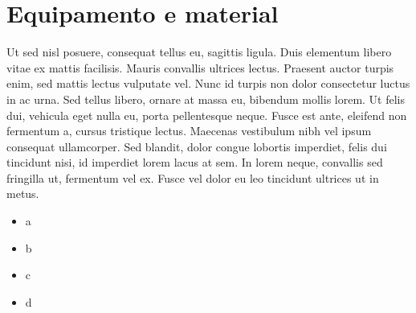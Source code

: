 \section{Equipamento e material}
Ut sed nisl posuere, consequat tellus eu, sagittis ligula. Duis elementum libero vitae ex mattis facilisis. Mauris convallis ultrices lectus. Praesent auctor turpis enim, sed mattis lectus vulputate vel. Nunc id turpis non dolor consectetur luctus in ac urna. Sed tellus libero, ornare at massa eu, bibendum mollis lorem. Ut felis dui, vehicula eget nulla eu, porta pellentesque neque. Fusce est ante, eleifend non fermentum a, cursus tristique lectus. Maecenas vestibulum nibh vel ipsum consequat ullamcorper. Sed blandit, dolor congue lobortis imperdiet, felis dui tincidunt nisi, id imperdiet lorem lacus at sem. In lorem neque, convallis sed fringilla ut, fermentum vel ex. Fusce vel dolor eu leo tincidunt ultrices ut in metus.

\begin{itemize}
    \item a
    \item b
    \item c
    \item d
\end{itemize}